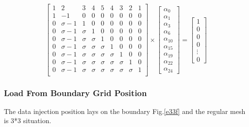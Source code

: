 \begin{equation}
{
\left[ \begin{array}{ccccccccc}
1 & 2 & 3 & 4 & 5 & 4 & 3 & 2 & 1\\
1 & -1 & 0 & 0 & 0 & 0 & 0 & 0& 0\\
0 & \sigma-1 & 1 & 0 & 0 & 0 &0 & 0 & 0 \\
0 & \sigma-1 & \sigma & 1 & 0 & 0 & 0 & 0 & 0 \\
0 & \sigma-1 & \sigma & \sigma & 1 & 0 & 0 & 0 & 0\\
0 & \sigma-1 & \sigma & \sigma & \sigma & 1 & 0& 0 & 0\\
0 & \sigma-1 & \sigma & \sigma & \sigma & \sigma & 1 & 0 & 0\\
0 & \sigma-1 & \sigma & \sigma & \sigma & \sigma & \sigma & 1 & 0\\
0 & \sigma-1 & \sigma & \sigma & \sigma & \sigma & \sigma & \sigma & 1\\
\end{array} 
\right ]} \times \left[ \begin{array}{c}
\alpha_{0} \\
\alpha_{1} \\
\alpha_{3} \\
\alpha_{6} \\
\alpha_{10} \\
\alpha_{15}\\
\alpha_{19}\\
\alpha_{22}\\
\alpha_{24}
\end{array} 
\right ] = \left[ \begin{array}{c}
1 \\
0 \\
0 \\
0 \\
\vdots \\
0
\end{array} 
\right ]
\end{equation}

\vspace*{50pt}

\subsubsection{Load From Boundary Grid Position}
The data injection position lays on the boundary Fig.\ref{e33f} and the regular mesh is 3*3 situation.

